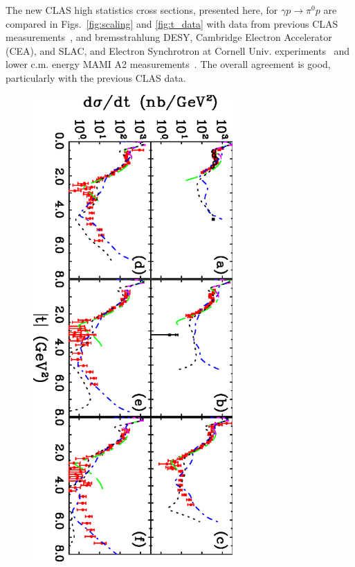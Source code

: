 \documentclass[aps,prc,twocolumn,floatfix,showpacs,preprintnumbers,amsmath,amssymb,superscriptaddress,linenumbers]{revtex4-1}
\begin{document}
The new CLAS high statistics cross sections, presented here, for
$\gamma p\rightarrow\pi^0p$ are compared in Figs.~\ref{fig:scaling}
and \ref{fig:t_data} with data from previous CLAS
measurements~\cite{Dugger:2007bt}, and bremsstrahlung DESY, Cambridge
Electron Accelerator (CEA), and SLAC, and Electron Synchrotron at
Cornell Univ. experiments~\cite{brem} and lower c.m. energy MAMI A2 measurements~\protect\cite{Adlarson:2015byy}. The overall agreement is good,
particularly with the previous CLAS data.
\begin{figure}[htb!]
\centerline{
        \includegraphics[width=3in, angle=90]{dsdt.eps}}


\end{figure}
\end{document}
